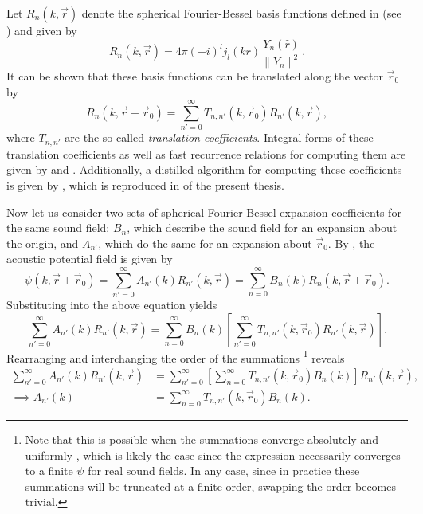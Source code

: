 Let $R_n(k, \vec{r})$ denote the spherical Fourier-Bessel basis functions defined in  (see ) and given by
\begin{equation}\label{eq:02_Acoustical_Theory:Basis_Functions}
R_n(k, \vec{r}) = 4\pi (-i)^l j_l(kr) \frac{Y_n(\hat{r})}{\|Y_n\|^2}.
\end{equation}
It can be shown that these basis functions can be translated along the vector $\vec{r}_0$ by \citep[Eq.~(3.2.1)]{GumerovDuraiswami2005}
\begin{equation}\label{eq:02_Acoustical_Theory:Translated_Basis_Functions}
R_n(k, \vec{r} + \vec{r}_0) = \sum_{n' = 0}^\infty T_{n,n'}(k,\vec{r}_0) R_{n'}(k, \vec{r}),
\end{equation}
where $T_{n,n'}$ are the so-called \textit{translation coefficients}.
Integral forms of these translation coefficients as well as fast recurrence relations for computing them are given by \citet[section~3.2]{GumerovDuraiswami2005} and \citet[chapter 3]{Zotter2009PhD}.
Additionally, a distilled algorithm for computing these coefficients is given by \citet{TylkaChoueiri2019a}, which is reproduced in  of the present thesis.

Now let us consider two sets of spherical Fourier-Bessel expansion coefficients for the same sound field: $B_n$, which describe the sound field for an expansion about the origin, and $A_{n'}$, which do the same for an expansion about $\vec{r}_0$.
By , the acoustic potential field is given by
\begin{equation}
\psi(k,\vec{r} + \vec{r}_0) = \sum_{n' = 0}^\infty A_{n'}(k) R_{n'}(k, \vec{r}) = \sum_{n = 0}^\infty B_n(k) R_n(k, \vec{r} + \vec{r}_0).
\end{equation}
Substituting  into the above equation yields
\begin{equation}
\sum_{n' = 0}^\infty A_{n'}(k) R_{n'}(k, \vec{r}) = \sum_{n = 0}^\infty B_n(k) \left[ \sum_{n' = 0}^\infty T_{n,n'}(k,\vec{r}_0) R_{n'}(k, \vec{r}) \right].
\end{equation}
Rearranging and interchanging the order of the summations%
\footnote{Note that this is possible when the summations converge absolutely and uniformly \citep[section 3.1.1]{GumerovDuraiswami2005}, which is likely the case since the expression necessarily converges to a finite $\psi$ for real sound fields.
In any case, since in practice these summations will be truncated at a finite order, swapping the order becomes trivial.}
reveals
\begin{align}
\sum_{n' = 0}^\infty A_{n'}(k) R_{n'}(k, \vec{r}) &= \sum_{n' = 0}^\infty \left[ \sum_{n = 0}^\infty T_{n,n'}(k,\vec{r}_0) B_n(k) \right] R_{n'}(k, \vec{r}), \\
\implies A_{n'}(k) &= \sum_{n = 0}^\infty T_{n,n'}(k, \vec{r}_0) B_n(k).
\end{align}


